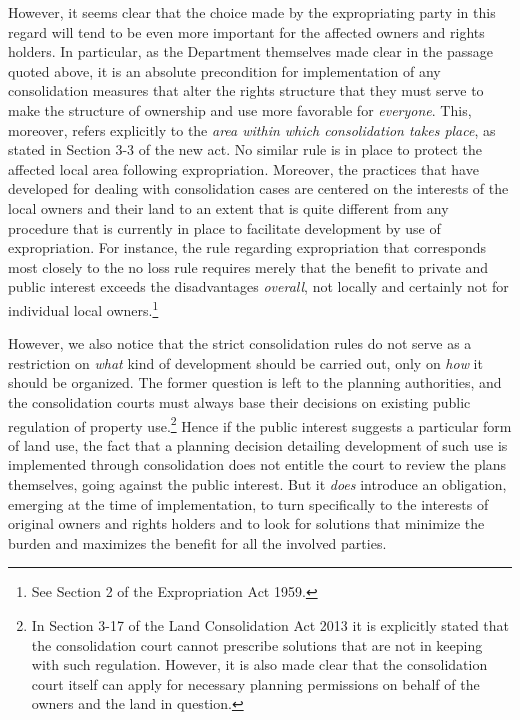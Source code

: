 \documentclass[10pt]{article} %
\begin{document}
However, it seems clear that the choice made by the expropriating party in this regard will tend to be even more important for the affected owners and rights holders. In particular, as the Department themselves made clear in the passage quoted above, it is an absolute precondition for implementation of any consolidation measures that alter the rights structure that they must serve to make the structure of ownership and use more favorable for \emph{everyone}. This, moreover, refers explicitly to the \emph{area within which consolidation takes place}, as stated in Section 3-3 of the new act. No similar rule is in place to protect the affected local area following expropriation. Moreover, the practices that have developed for dealing with consolidation cases are centered on the interests of the local owners and their land to an extent that is quite different from any procedure that is currently in place to facilitate development by use of expropriation.
For instance, the rule regarding expropriation that corresponds most closely to the no loss rule  
requires merely that the benefit to private and public interest exceeds the disadvantages \emph{overall}, not locally and certainly not for individual local owners.\footnote{See Section 2 of the Expropriation Act 1959.} 


However, we also notice that the strict consolidation rules do not serve as a restriction on \emph{what} kind of development should be carried out, only on \emph{how} it should be organized. The former question is left to the planning authorities, and the consolidation courts must always base their decisions on existing public regulation of property use.\footnote{In Section 3-17 of the Land Consolidation Act 2013 it is explicitly stated that the consolidation court cannot prescribe solutions that are not in keeping with such regulation. However, it is also made clear that the consolidation court itself can apply for necessary planning permissions on behalf of the owners and the land in question.} Hence if the public interest suggests a particular form of land use, the fact that a planning decision detailing development of such use is implemented through consolidation does not entitle the court to review the plans themselves, going against the public interest. But it \emph{does} introduce an obligation, emerging at the time of implementation, to turn specifically to the interests of original owners and rights holders and to look for solutions that minimize the burden and maximizes the benefit for all the involved parties.
\end{document}
